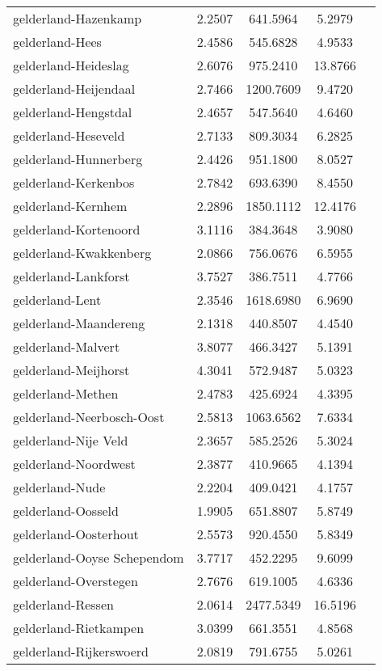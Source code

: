 \begin{longtable}{llccc}
gelderland-Hazenkamp & 2.2507 & 641.5964 & 5.2979 \\
gelderland-Hees & 2.4586 & 545.6828 & 4.9533 \\
gelderland-Heideslag & 2.6076 & 975.2410 & 13.8766 \\
gelderland-Heijendaal & 2.7466 & 1200.7609 & 9.4720 \\
gelderland-Hengstdal & 2.4657 & 547.5640 & 4.6460 \\
gelderland-Heseveld & 2.7133 & 809.3034 & 6.2825 \\
gelderland-Hunnerberg & 2.4426 & 951.1800 & 8.0527 \\
gelderland-Kerkenbos & 2.7842 & 693.6390 & 8.4550 \\
gelderland-Kernhem & 2.2896 & 1850.1112 & 12.4176 \\
gelderland-Kortenoord & 3.1116 & 384.3648 & 3.9080 \\
gelderland-Kwakkenberg & 2.0866 & 756.0676 & 6.5955 \\
gelderland-Lankforst & 3.7527 & 386.7511 & 4.7766 \\
gelderland-Lent & 2.3546 & 1618.6980 & 6.9690 \\
gelderland-Maandereng & 2.1318 & 440.8507 & 4.4540 \\
gelderland-Malvert & 3.8077 & 466.3427 & 5.1391 \\
gelderland-Meijhorst & 4.3041 & 572.9487 & 5.0323 \\
gelderland-Methen & 2.4783 & 425.6924 & 4.3395 \\
gelderland-Neerbosch-Oost & 2.5813 & 1063.6562 & 7.6334 \\
gelderland-Nije Veld & 2.3657 & 585.2526 & 5.3024 \\
gelderland-Noordwest & 2.3877 & 410.9665 & 4.1394 \\
gelderland-Nude & 2.2204 & 409.0421 & 4.1757 \\
gelderland-Oosseld & 1.9905 & 651.8807 & 5.8749 \\
gelderland-Oosterhout & 2.5573 & 920.4550 & 5.8349 \\
gelderland-Ooyse Schependom & 3.7717 & 452.2295 & 9.6099 \\
gelderland-Overstegen & 2.7676 & 619.1005 & 4.6336 \\
gelderland-Ressen & 2.0614 & 2477.5349 & 16.5196 \\
gelderland-Rietkampen & 3.0399 & 661.3551 & 4.8568 \\
gelderland-Rijkerswoerd & 2.0819 & 791.6755 & 5.0261 \\

\end{longtable}
